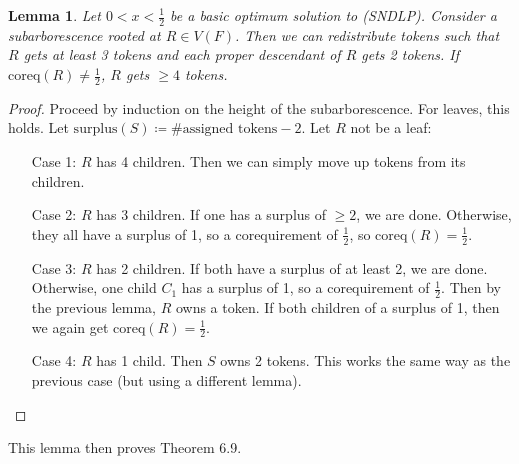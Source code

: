 \documentclass[11pt, a4paper]{article}
\newtheorem{lemma}[theorem]{Lemma}
\theoremstyle{remark}
\theoremstyle{definition}
\begin{document}
\begin{lemma}
	Let $0<x<\frac{1}{2}$ be a basic optimum solution to (SNDLP). Consider
	a subarborescence rooted at $R\in V(F)$. Then we can redistribute tokens
	such that $R$ gets at least 3 tokens and each proper descendant of $R$
	gets 2 tokens. If $\mathrm{coreq}(R)\neq\frac{1}{2}$, $R$ gets $\geq4$
	tokens.
\end{lemma}
\begin{proof}
	Proceed by induction on the height of the subarborescence. For leaves,
	this holds. Let $\mathrm{surplus}(S)\coloneqq \#\text{assigned tokens}
	-2$. Let $R$ not be a leaf:
	\begin{enumerate}
		\item[Case 1:] $R$ has 4 children. Then we can simply move up tokens
		from its children.
		\item[Case 2:] $R$ has 3 children. If one has a surplus of $\geq2$,
		we are done. Otherwise, they all have a surplus of 1, so a corequirement
		of $\frac{1}{2}$, so $\mathrm{coreq}(R)=\frac{1}{2}$.
		\item[Case 3:] $R$ has 2 children. If both have a surplus of at least
		2, we are done. Otherwise, one child $C_1$ has a surplus of 1, so a corequirement
		of $\frac{1}{2}$. Then by the previous lemma, $R$ owns a token. If
		both children of a surplus of 1, then we again get $\mathrm{coreq}(R)
		=\frac{1}{2}$.
		\item[Case 4:] $R$ has 1 child. Then $S$ owns 2 tokens. This works
		the same way as the previous case (but using a different lemma).
	\end{enumerate}
\end{proof}
This lemma then proves Theorem 6.9.
\end{document}
